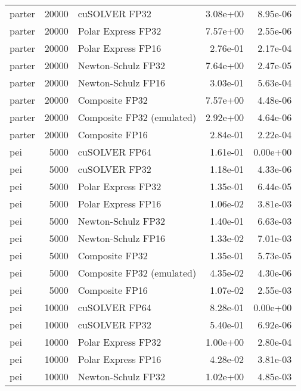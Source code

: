\begin{table}
\begin{tabular}{lrlrr}
   parter & 20000 &             cuSOLVER FP32 &  3.08e+00 &        8.95e-06 \\
   parter & 20000 &        Polar Express FP32 &  7.57e+00 &        2.55e-06 \\
   parter & 20000 &        Polar Express FP16 &  2.76e-01 &        2.17e-04 \\
   parter & 20000 &        Newton-Schulz FP32 &  7.64e+00 &        2.47e-05 \\
   parter & 20000 &        Newton-Schulz FP16 &  3.03e-01 &        5.63e-04 \\
   parter & 20000 &            Composite FP32 &  7.57e+00 &        4.48e-06 \\
   parter & 20000 & Composite FP32 (emulated) &  2.92e+00 &        4.64e-06 \\
   parter & 20000 &            Composite FP16 &  2.84e-01 &        2.22e-04 \\
      pei &  5000 &             cuSOLVER FP64 &  1.61e-01 &        0.00e+00 \\
      pei &  5000 &             cuSOLVER FP32 &  1.18e-01 &        4.33e-06 \\
      pei &  5000 &        Polar Express FP32 &  1.35e-01 &        6.44e-05 \\
      pei &  5000 &        Polar Express FP16 &  1.06e-02 &        3.81e-03 \\
      pei &  5000 &        Newton-Schulz FP32 &  1.40e-01 &        6.63e-03 \\
      pei &  5000 &        Newton-Schulz FP16 &  1.33e-02 &        7.01e-03 \\
      pei &  5000 &            Composite FP32 &  1.35e-01 &        5.73e-05 \\
      pei &  5000 & Composite FP32 (emulated) &  4.35e-02 &        4.30e-06 \\
      pei &  5000 &            Composite FP16 &  1.07e-02 &        2.55e-03 \\
      pei & 10000 &             cuSOLVER FP64 &  8.28e-01 &        0.00e+00 \\
      pei & 10000 &             cuSOLVER FP32 &  5.40e-01 &        6.92e-06 \\
      pei & 10000 &        Polar Express FP32 &  1.00e+00 &        2.80e-04 \\
      pei & 10000 &        Polar Express FP16 &  4.28e-02 &        3.81e-03 \\
      pei & 10000 &        Newton-Schulz FP32 &  1.02e+00 &        4.85e-03 \\

\end{tabular}
\end{table}
